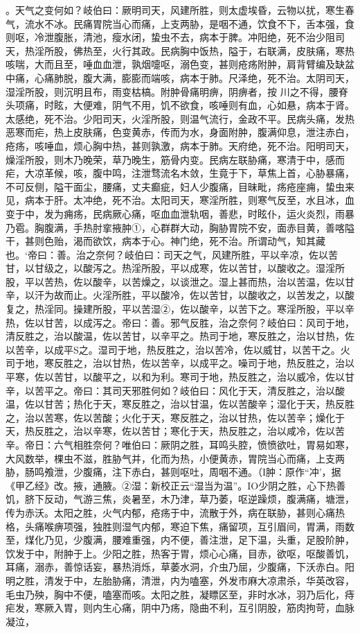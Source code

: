 \documentclass[a4paper,12pt,UTF8,twoside]{ctexbook}
\begin{document}
。天气之变何如？岐伯曰：厥明司天，风建所胜，则太虚埃昏，云物以扰，寒生春气，流水不冰。民痛胃院当心而痛，上支两胁，是咽不通，饮食不下，舌本强，食则呕，冷泄腹胀，清池，瘦水闭，蛰虫不去，病本于脾。冲阳绝，死不治少阻司天，热淫所股，佛热至，火行其政。民病胸中饭热，隘于，右联满，皮肤痛，寒热咳喘，大而且至，唾血血泄，孰烟嚏呕，溺色变，甚则疮疡附肿，肩背臂编及缺盆中痛，心痛肺脱，腹大满，膨膨而端咳，病本于肺。尺泽绝，死不治。太阴司天，湿淫所股，则沉明且布，雨变枯槁。附肿骨痛明痹，阴痹者，按
川之不得，腰脊头项痛，时眩，大便难，阴气不用，饥不欲食，咳唾则有血，心如悬，病本于肾。太感绝，死不治。少阳司天，火淫所股，则温气流行，金政不平。民病头痛，发热恶寒而疟，热上皮肤痛，色变黄赤，传而为水，身面附肿，腹满仰息，泄注赤白，疮疡，咳唾血，烦心胸中热，甚则孰激，病本于肺。天府绝，死不治。阳明司天，燥淫所股，则木乃晚荣，草乃晚生，筋骨内变。民病左联胁痛，寒清于中，感而疟，大凉革候，咳，腹中鸣，注泄骛流名木敛，生竟于下，草焦上首，心胁暴痛，不可反侧，隘干面尘，腰痛，丈夫癫疵，妇人少腹痛，目昧毗，疡疮座痈，蛰虫来见，病本于肝。太冲绝，死不治。太阳司天，寒淫所胜，则寒气反至，水且冰，血变于中，发为痈疡，民病厥心痛，呕血血泄轨咽，善悲，时眩仆，运火炎烈，雨暴乃雹。胸腹满，手热肘挛掖肿①，心群群大动，胸胁胃院不安，面赤目黄，善喀隘干，甚则色贻，渴而欲饮，病本于心。神门绝，死不治。所谓动气，知其藏也。‘帝曰：善。治之奈何？岐伯曰：司天之气，风建所胜，平以辛凉，佐以苦甘，以甘级之，以酸泻之。热淫所股，平以成寒，佐以苦甘，以酸收之。湿淫所股，平以苦热，佐以酸辛，以苦燥之，以谈泄之。湿上甚而热，治以苦温，佐以甘辛，以汗为故而止。火淫所胜，平以酸冷，佐以苦甘，以酸收之，以苦发之，以酸复之，热淫同。操建所股，平以苦湿②，佐以酸辛，以苦下之。寒淫所股，平以辛热，佐以甘苦，以成泻之。帝曰：善。邪气反胜，治之奈何？岐伯曰：风司于地，清反胜之，治以酸温，佐以苦甘，以辛平之。热司于地，寒反胜之，治以甘热，佐以苦辛，以成平S之。湿司于地，热反胜之，治以苦冷，佐以威甘，以苦干之。火司于地，寒反胜之，治以甘热，佐以苦辛，以成平之。噪司于地，热反胜之，治以平寒，佐以苦甘，以酸平之，以和为利。寒司于地，热反胜之，治以威冷，佐以甘辛，以苦平之。帝曰：其司天邪胜何如？岐伯曰：风化于天，清反胜之，治以酸温，佐以甘苦；热化于天，寒反胜之，治以甘温，佐以苦酸辛；湿化于天，热反胜之，治以苦寒，佐以苦酸；火化于天，寒反胜之，治以甘热，佐以苦辛；燥化于天，热反胜之，治以辛寒，佐以苦甘；寒化于天，热反胜之，治以咸冷，佐以苦辛。帝日：六气相胜奈何？唯伯曰：厥阴之胜，耳鸣头腔，愤愤欲吐，胃易如寒，大风数举，棵虫不滋，胜胁气并，化而为热，小便黄赤，胃院当心而痛，上支两胁，肠鸣飧泄，少腹痛，注下赤白，甚则呕吐，周咽不通。（I肿：原作“冲’，据《甲乙经》改。掖，通腋。②湿：新校正云“湿当为温”。IO少阴之胜，心下热善饥，脐下反动，气游三焦，炎暑至，木乃津，草乃萎，呕逆躁烦，腹满痛，塘泄，传为赤沃。太阳之胜，火气内郁，疮疡于中，流散于外，病在联胁，甚则心痛热格，头痛喉痹项强，独胜则湿气内郁，寒迫下焦，痛留项，互引眉间，胃满，雨数至，煤化乃见，少腹满，腰难重强，内不便，善注泄，足下温，头重，足股阶肿，饮发于中，附肿于上。少阳之胜，热客于胃，烦心心痛，目赤，欲呕，呕酸善饥，耳痛，溺赤，善惊话妄，暴热消烁，草萎水洞，介虫乃屈，少腹痛，下沃赤白。阳明之胜，清发于中，左胎胁痛，清泄，内为嗑塞，外发市麻大凉肃杀，华英改容，毛虫乃殃，胸中不便，嗑塞而咳。太阳之胜，凝瞟区至，非时水冰，羽乃后化，痔疟发，寒厥入胃，则内生心痛，阴中乃疡，隐曲不利，互引阴股，筋肉拘苛，血脉凝泣，
\end{document}
